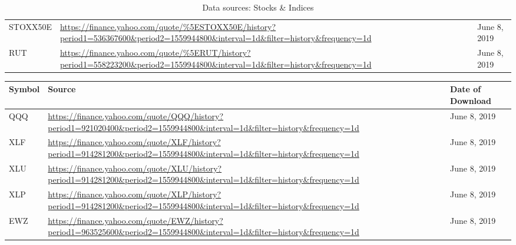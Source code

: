 \documentclass[11pt, a4paper]{article}
\begin{document}
\begin{table}[H]
\begin{tabular}{p{3.0cm} p{10.0cm}l}
        STOXX50E                                                                    & \url{https://finance.yahoo.com/quote/\%5ESTOXX50E/history?period1=536367600\&period2=1559944800\&interval=1d\&filter=history\&frequency=1d} & June 8, 2019              \\
        RUT                                                                         & \url{https://finance.yahoo.com/quote/\%5ERUT/history?period1=558223200\&period2=1559944800\&interval=1d\&filter=history\&frequency=1d}      & June 8, 2019              \\ \hline
        \end{tabular}
        \caption{Data sources: Stocks \& Indices}
        \label{tbl:datasets_stocks}
    \end{table}
    
        \begin{table}[H]
    \centering
        \begin{tabular}{p{3.0cm} p{10.0cm}l}
        \hline
        \textbf{Symbol}                                                             & \textbf{Source}                                                                                                                                              & \textbf{Date of Download} \\ \hline
        QQQ                                                                         & \url{https://finance.yahoo.com/quote/QQQ/history?period1=921020400\&period2=1559944800\&interval=1d\&filter=history\&frequency=1d}          & June 8, 2019              \\
        XLF                                                                         & \url{https://finance.yahoo.com/quote/XLF/history?period1=914281200\&period2=1559944800\&interval=1d\&filter=history\&frequency=1d}          & June 8, 2019              \\
        XLU                                                                         & \url{https://finance.yahoo.com/quote/XLU/history?period1=914281200\&period2=1559944800\&interval=1d\&filter=history\&frequency=1d}          & June 8, 2019              \\
        XLP                                                                         & \url{https://finance.yahoo.com/quote/XLP/history?period1=914281200\&period2=1559944800\&interval=1d\&filter=history\&frequency=1d}          & June 8, 2019              \\
        EWZ                                                                         & \url{https://finance.yahoo.com/quote/EWZ/history?period1=963525600\&period2=1559944800\&interval=1d\&filter=history\&frequency=1d}          & June 8, 2019              \\

\end{tabular}
\end{table}
\end{document}
